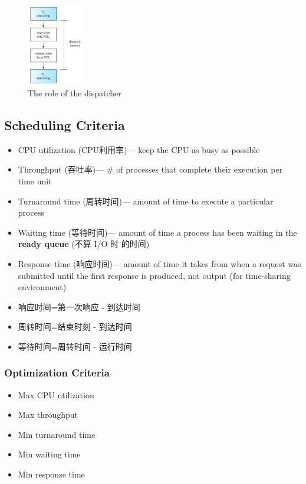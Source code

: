 \begin{figure}[!htb]
    \centering
    \includegraphics[width=0.22\textwidth]{pic/OS5/The role of the dispatcher}
    \caption{The role of the dispatcher}
\end{figure}

\subsection{Scheduling Criteria}
\begin{itemize}\scriptsize
    \item CPU utilization (CPU利用率)--- keep the CPU as busy as possible
    \item Throughput (吞吐率)--- \# of processes that complete their execution per time unit
    \item Turnaround time (周转时间)--- amount of time to execute a particular process
    \item Waiting time (等待时间)--- amount of time a process has been waiting in the \textbf{ready queue} (不算 I/O 时 的时间)
    \item Response time (响应时间)--- amount of time it takes from when a request was submitted until the first response is produced, not output (for time-sharing environment)
\end{itemize}

\begin{itemize}
    \item 响应时间=第一次响应 - 到达时间
    \item 周转时间=结束时刻 - 到达时间
    \item 等待时间=周转时间 - 运行时间
\end{itemize}
\subsubsection{Optimization Criteria} 
\begin{itemize}\small
    \item Max CPU utilization
    \item Max throughput
    \item Min turnaround time
    \item Min waiting time
    \item Min response time
\end{itemize}


